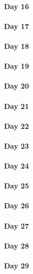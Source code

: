 \documentclass[UTF8,a4paper,8pt]{ctexart}
\begin{document}
 	 \paragraph{Day 16      \quad     }
 	 \paragraph{Day 17      \quad     }
 	 \paragraph{Day 18      \quad     }
 	 \paragraph{Day 19      \quad     }
 	 \paragraph{Day 20      \quad     }
 	 \paragraph{Day 21      \quad     }
 	 \paragraph{Day 22      \quad     }
 	 \paragraph{Day 23      \quad     }
 	 \paragraph{Day 24      \quad     }
 	 \paragraph{Day 25      \quad     }
 	 \paragraph{Day 26      \quad     }
 	 \paragraph{Day 27      \quad     }
 	 \paragraph{Day 28      \quad     }
 	 \paragraph{Day 29      \quad     }   
\end{document}
